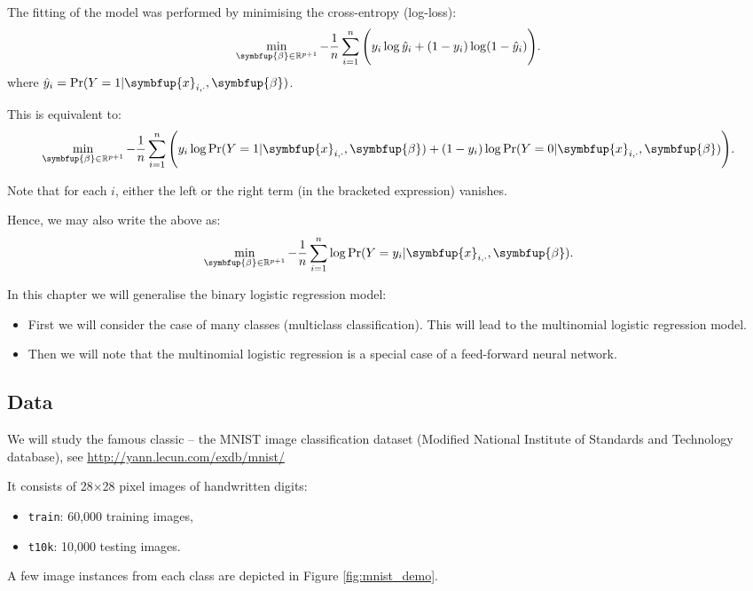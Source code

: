 \documentclass[10pt,b5paper,krantz1]{krantz}
\providecommand{\tightlist}{%
  \setlength{\itemsep}{0pt}\setlength{\parskip}{0pt}}
\renewcommand{\mathbf}[1]{\symbfup{#1}}
\renewcommand{\boldsymbol}[1]{\symbfup{#1}}
\begin{document}
The fitting of the model was performed by minimising the cross-entropy (log-loss):
\[
\min_{\boldsymbol\beta\in\mathbb{R}^{p+1}}
-\frac{1}{n} \sum_{i=1}^n
\Bigg(y_i\log \hat{y}_i + (1-y_i)\log (1-\hat{y}_i)\Bigg).
\]
where \(\hat{y}_i=\Pr(Y=1|\mathbf{x}_{i,\cdot},\boldsymbol\beta)\).

This is equivalent to:
\[
\min_{\boldsymbol\beta\in\mathbb{R}^{p+1}}
-\frac{1}{n} \sum_{i=1}^n
\Bigg(y_i\log \Pr(Y=1|\mathbf{x}_{i,\cdot},\boldsymbol\beta) + (1-y_i)\log \Pr(Y=0|\mathbf{x}_{i,\cdot},\boldsymbol\beta)\Bigg).
\]

Note that for each \(i\),
either the left or the right term (in the bracketed expression) vanishes.

Hence, we may also write the above as:
\[
\min_{\boldsymbol\beta\in\mathbb{R}^{p+1}}
-\frac{1}{n} \sum_{i=1}^n
\log \Pr(Y=y_i|\mathbf{x}_{i,\cdot},\boldsymbol\beta).
\]

In this chapter we will generalise the binary logistic regression model:

\begin{itemize}
\item
  First we will consider the case of many classes
  (multiclass classification).
  This will lead to the multinomial logistic regression model.
\item
  Then we will note that the multinomial logistic regression is a special
  case of a feed-forward neural network.
\end{itemize}

\hypertarget{data-2}{%
\subsection{Data}\label{data-2}}

We will study the famous classic -- the MNIST image classification dataset
(Modified National Institute of Standards and Technology database),
see \url{http://yann.lecun.com/exdb/mnist/}

It consists of 28×28 pixel images of handwritten digits:

\begin{itemize}
\tightlist
\item
  \texttt{train}: 60,000 training images,
\item
  \texttt{t10k}: 10,000 testing images.
\end{itemize}

A few image instances from each class are depicted in
Figure \ref{fig:mnist_demo}.
\end{document}
